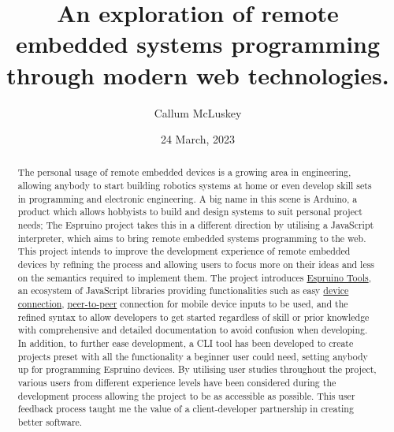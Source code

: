 \documentclass{l4proj}
\begin{document}
\title{An exploration of remote embedded systems programming through modern web technologies.}
\author{Callum McLuskey}
\date{24 March, 2023}


\maketitle

\begin{abstract}

    The personal usage of remote embedded devices is a growing area in engineering, allowing anybody to start building robotics systems at home or even develop skill sets in programming and electronic engineering. A big name in this scene is Arduino, a product which allows hobbyists to build and design systems to suit personal project needs; The Espruino project takes this in a different direction by utilising a JavaScript interpreter, which aims to bring remote embedded systems programming to the web. This project intends to improve the development experience of remote embedded devices by refining the process and allowing users to focus more on their ideas and less on the semantics required to implement them. The project introduces \href{https://github.com/espruino-tools}{Espruino Tools}, an ecosystem of JavaScript libraries providing functionalities such as easy \href{https://github.com/espruino-tools/core}{device connection}, \href{https://github.com/espruino-tools/peer}{peer-to-peer} connection for mobile device inputs to be used, and the refined syntax to allow developers to get started regardless of skill or prior knowledge with comprehensive and detailed documentation to avoid confusion when developing. In addition, to further ease development, a CLI tool has been developed to create projects preset with all the functionality a beginner user could need, setting anybody up for programming Espruino devices. By utilising user studies throughout the project, various users from different experience levels have been considered during the development process allowing the project to be as accessible as possible. This user feedback process taught me the value of a client-developer partnership in creating better software.

\end{abstract}

\def\consentname {Callum McLuskey} %
\def\consentdate {23 March 2023} %
\end{document}
